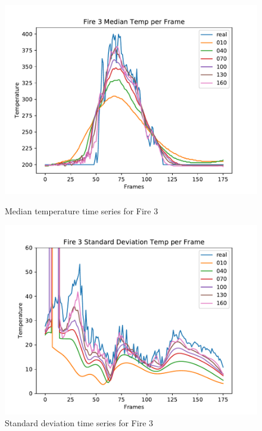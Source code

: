 \documentclass{article}
\begin{document}
\begin{figure}[ht]
  \begin{minipage}[b]{0.5\linewidth}
    \centering
    \includegraphics[width=1.05\linewidth]{../plots/f3_mediantemp.pdf} 
    \caption{Median temperature time series for Fire 3} 
    \vspace{4ex}
  \end{minipage}%
  \begin{minipage}[b]{0.5\linewidth}
    \centering
    \includegraphics[width=1.05\linewidth]{../plots/f3_stdtemp.pdf} 
    \caption{Standard deviation time series for Fire 3} 
    \vspace{4ex}
  \end{minipage} 

\end{figure}
\end{document}
